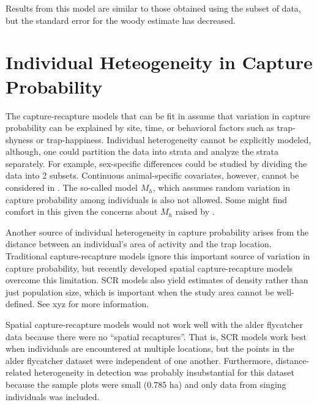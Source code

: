 \documentclass[a4paper]{article}
\begin{document}
Results from this model are similar to those obtained using the subset
of data, but the standard error for the woody estimate has decreased.


\section*{Individual Heteogeneity in Capture Probability}

The capture-recapture models that can be fit in  assume
that variation in capture probability can be
explained by site, time, or behavioral factors such as trap-shyness or
trap-happiness. Individual
heterogeneity cannot be explicitly modeled, although, one could
partition the data into strata and analyze the strata separately. For
example, sex-specific
differences could be studied by dividing the data into 2 subsets.
Continuous animal-specific covariates, however, cannot be
considered in . The so-called model $M_h$, which assumes
random variation in capture probability among individuals is also not
allowed. Some might find comfort in this given the concerns about
$M_h$ raised by \citet{link:2003}.

Another source of individual heterogeneity in capture probability
arises from the distance between an individual's area of activity and
the trap location. Traditional capture-recapture models ignore this
important source of variation in capture probability, but
recently developed spatial capture-recapture models overcome this
limitation. SCR models also yield estimates of density rather than
just population size, which is important when the study area cannot be
well-defined. See xyz for
more information.

Spatial capture-recapture models would not work well with the alder
flycatcher data because there were no ``spatial recaptures''. That is,
SCR models work best when individuals are encountered at multiple
locations, but the points in the alder flycatcher dataset were
independent of one another. Furthermore,
distance-related heterogeneity in detection was probably insubstantial
for this dataset because
the sample plots were small (0.785 ha) and only data from
singing individuals was included.


\end{document}
